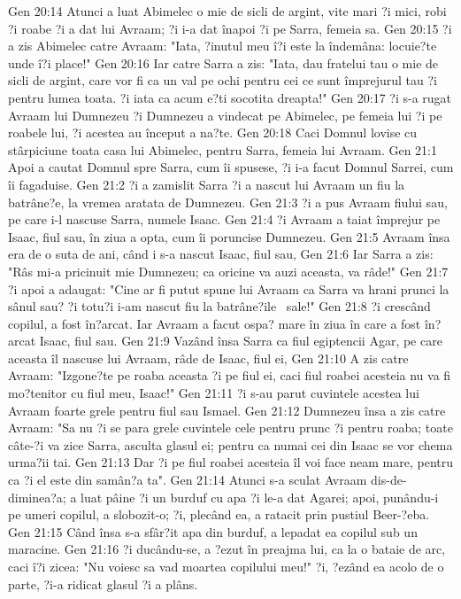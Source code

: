 Gen 20:14  Atunci a luat Abimelec o mie de sicli de argint, vite mari ?i mici, robi ?i roabe ?i a dat lui Avraam; ?i i-a dat înapoi ?i pe Sarra, femeia sa.
Gen 20:15  ?i a zis Abimelec catre Avraam: "Iata, ?inutul meu î?i este la îndemâna: locuie?te unde î?i place!"
Gen 20:16  Iar catre Sarra a zis: "Iata, dau fratelui tau o mie de sicli de argint, care vor fi ca un val pe ochi pentru cei ce sunt împrejurul tau ?i pentru lumea toata. ?i iata ca acum e?ti socotita dreapta!"
Gen 20:17  ?i s-a rugat Avraam lui Dumnezeu ?i Dumnezeu a vindecat pe Abimelec, pe femeia lui ?i pe roabele lui, ?i acestea au început a na?te.
Gen 20:18  Caci Domnul lovise cu stârpiciune toata casa lui Abimelec, pentru Sarra, femeia lui Avraam.
Gen 21:1  Apoi a cautat Domnul spre Sarra, cum îi spusese, ?i i-a facut Domnul Sarrei, cum îi fagaduise.
Gen 21:2  ?i a zamislit Sarra ?i a nascut lui Avraam un fiu la batrâne?e, la vremea aratata de Dumnezeu.
Gen 21:3  ?i a pus Avraam fiului sau, pe care i-l nascuse Sarra, numele Isaac.
Gen 21:4  ?i Avraam a taiat împrejur pe Isaac, fiul sau, în ziua a opta, cum îi poruncise Dumnezeu.
Gen 21:5  Avraam însa era de o suta de ani, când i s-a nascut Isaac, fiul sau,
Gen 21:6  Iar Sarra a zis: "Râs mi-a pricinuit mie Dumnezeu; ca oricine va auzi aceasta, va râde!"
Gen 21:7  ?i apoi a adaugat: "Cine ar fi putut spune lui Avraam ca Sarra va hrani prunci la sânul sau? ?i totu?i i-am nascut fiu la batrâne?ile  sale!"
Gen 21:8  ?i crescând copilul, a fost în?arcat. Iar Avraam a facut ospa? mare în ziua în care a fost în?arcat Isaac, fiul sau.
Gen 21:9  Vazând însa Sarra ca fiul egiptencii Agar, pe care aceasta îl nascuse lui Avraam, râde de Isaac, fiul ei,
Gen 21:10  A zis catre Avraam: "Izgone?te pe roaba aceasta ?i pe fiul ei, caci fiul roabei acesteia nu va fi mo?tenitor cu fiul meu, Isaac!"
Gen 21:11  ?i s-au parut cuvintele acestea lui Avraam foarte grele pentru fiul sau Ismael.
Gen 21:12  Dumnezeu însa a zis catre Avraam: "Sa nu ?i se para grele cuvintele cele pentru prunc ?i pentru roaba; toate câte-?i va zice Sarra, asculta glasul ei; pentru ca numai cei din Isaac se vor chema urma?ii tai.
Gen 21:13  Dar ?i pe fiul roabei acesteia îl voi face neam mare, pentru ca ?i el este din samân?a ta".
Gen 21:14  Atunci s-a sculat Avraam dis-de-diminea?a; a luat pâine ?i un burduf cu apa ?i le-a dat Agarei; apoi, punându-i pe umeri copilul, a slobozit-o; ?i, plecând ea, a ratacit prin pustiul Beer-?eba.
Gen 21:15  Când însa s-a sfâr?it apa din burduf, a lepadat ea copilul sub un maracine.
Gen 21:16  ?i ducându-se, a ?ezut în preajma lui, ca la o bataie de arc, caci î?i zicea: "Nu voiesc sa vad moartea copilului meu!" ?i, ?ezând ea acolo de o parte, ?i-a ridicat glasul ?i a plâns.
